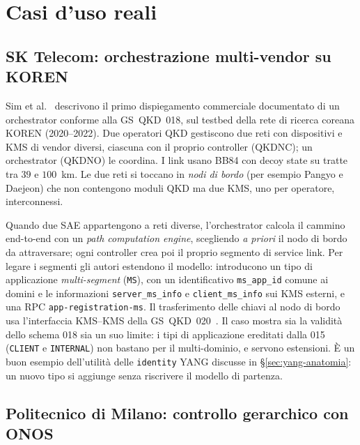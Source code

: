 \section{Casi d'uso reali}
\label{sec:casi}

\subsection{SK Telecom: orchestrazione multi-vendor su KOREN}
\label{sec:sim}

Sim et al.~\cite{sim2023} descrivono il primo dispiegamento commerciale
documentato di un orchestrator conforme alla GS~QKD~018, sul testbed della
rete di ricerca coreana KOREN (2020–2022). Due operatori QKD gestiscono due
reti con dispositivi e KMS di vendor diversi, ciascuna con il proprio
controller (QKDNC); un orchestrator (QKDNO) le coordina. I link usano BB84
con decoy state su tratte tra $39$ e $100$~km. Le due reti si toccano in
\emph{nodi di bordo} (per esempio Pangyo e Daejeon) che non contengono
moduli QKD ma due KMS, uno per operatore, interconnessi.

Quando due SAE appartengono a reti diverse, l'orchestrator calcola il
cammino end-to-end con un \emph{path computation engine}, scegliendo
\emph{a priori} il nodo di bordo da attraversare; ogni controller crea poi
il proprio segmento di service link. Per legare i segmenti gli autori
estendono il modello: introducono un tipo di applicazione
\emph{multi-segment} (\texttt{MS}), con un identificativo
\texttt{ms\_app\_id} comune ai domini e le informazioni
\texttt{server\_ms\_info} e \texttt{client\_ms\_info} sui KMS esterni, e una
RPC \texttt{app-registration-ms}. Il trasferimento delle chiavi al nodo di
bordo usa l'interfaccia KMS–KMS della GS~QKD~020~\cite{qkd020}. Il caso
mostra sia la validità dello schema 018 sia un suo limite: i tipi di
applicazione ereditati dalla 015 (\texttt{CLIENT} e \texttt{INTERNAL}) non
bastano per il multi-dominio, e servono estensioni. È un buon esempio
dell'utilità delle \texttt{identity} YANG discusse in
§\ref{sec:yang-anatomia}: un nuovo tipo si aggiunge senza riscrivere il
modello di partenza.

\subsection{Politecnico di Milano: controllo gerarchico con ONOS}

